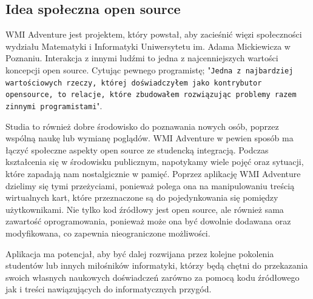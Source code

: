 \documentclass{article}
\begin{document}
\subsection{Idea społeczna open source}

\hspace{4mm} WMI Adventure jest projektem, który powstał, aby zacieśnić więzi społeczności wydziału Matematyki i Informatyki Uniwersytetu im. Adama Mickiewicza w Poznaniu. Interakcja z innymi ludźmi to jedna z najcenniejszych wartości koncepcji open source. Cytując pewnego programistę; "\texttt{Jedna z najbardziej wartościowych rzeczy, której doświadczyłem jako kontrybutor open\newline source, to relacje, które zbudowałem rozwiązując problemy razem z\newline innymi programistami}"\cite{kentcdodds}. 

Studia to również dobre środowisko do poznawania nowych osób, poprzez wspólną naukę lub wymianę poglądów. WMI Adventure w pewien sposób ma łączyć społeczne aspekty open source ze studencką integracją. Podczas kształcenia się w środowisku publicznym, napotykamy wiele pojęć oraz sytuacji, które zapadają nam nostalgicznie w pamięć. Poprzez aplikację WMI Adventure dzielimy się tymi przeżyciami, ponieważ polega ona na manipulowaniu treścią wirtualnych kart, które przeznaczone są do pojedynkowania się pomiędzy użytkownikami. Nie tylko kod źródłowy jest open source, ale również sama zawartość oprogramowania, ponieważ może ona być dowolnie dodawana oraz modyfikowana, co zapewnia nieograniczone możliwości.

Aplikacja ma potencjał, aby być dalej rozwijana przez kolejne pokolenia studentów lub innych miłośników informatyki, którzy będą chętni do przekazania swoich własnych naukowych doświadczeń zarówno za pomocą kodu źródłowego jak i treści nawiązujących do informatycznych przygód.
\end{document}
